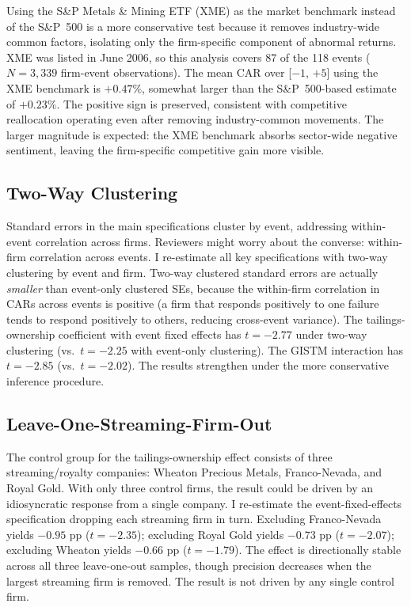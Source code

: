 \documentclass[12pt]{article}
\begin{document}
Using the S\&P Metals \& Mining ETF (XME) as the market benchmark instead of the S\&P~500 is a more conservative test because it removes industry-wide common factors, isolating only the firm-specific component of abnormal returns. XME was listed in June 2006, so this analysis covers 87 of the 118 events ($N=3{,}339$ firm-event observations). The mean CAR over [$-1$, $+5$] using the XME benchmark is $+0.47\%$, somewhat larger than the S\&P~500-based estimate of $+0.23\%$. The positive sign is preserved, consistent with competitive reallocation operating even after removing industry-common movements. The larger magnitude is expected: the XME benchmark absorbs sector-wide negative sentiment, leaving the firm-specific competitive gain more visible.


\subsection{Two-Way Clustering}

Standard errors in the main specifications cluster by event, addressing within-event correlation across firms. Reviewers might worry about the converse: within-firm correlation across events. I re-estimate all key specifications with two-way clustering by event and firm. Two-way clustered standard errors are actually \emph{smaller} than event-only clustered SEs, because the within-firm correlation in CARs across events is positive (a firm that responds positively to one failure tends to respond positively to others, reducing cross-event variance). The tailings-ownership coefficient with event fixed effects has $t=-2.77$ under two-way clustering (vs.\ $t=-2.25$ with event-only clustering). The GISTM interaction has $t=-2.85$ (vs.\ $t=-2.02$). The results strengthen under the more conservative inference procedure.

\subsection{Leave-One-Streaming-Firm-Out}

The control group for the tailings-ownership effect consists of three streaming/royalty companies: Wheaton Precious Metals, Franco-Nevada, and Royal Gold. With only three control firms, the result could be driven by an idiosyncratic response from a single company. I re-estimate the event-fixed-effects specification dropping each streaming firm in turn. Excluding Franco-Nevada yields $-0.95$ pp ($t=-2.35$); excluding Royal Gold yields $-0.73$ pp ($t=-2.07$); excluding Wheaton yields $-0.66$ pp ($t=-1.79$). The effect is directionally stable across all three leave-one-out samples, though precision decreases when the largest streaming firm is removed. The result is not driven by any single control firm.
\end{document}
